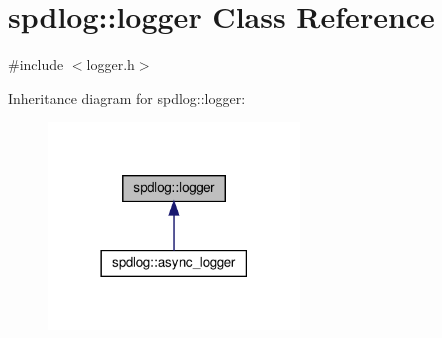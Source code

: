 \hypertarget{classspdlog_1_1logger}{}\section{spdlog\+:\+:logger Class Reference}
\label{classspdlog_1_1logger}


{\ttfamily \#include $<$logger.\+h$>$}



Inheritance diagram for spdlog\+:\+:logger\+:
\nopagebreak
\begin{figure}[H]
\begin{center}
\leavevmode
\includegraphics[width=189pt]{classspdlog_1_1logger__inherit__graph}
\end{center}
\end{figure}
